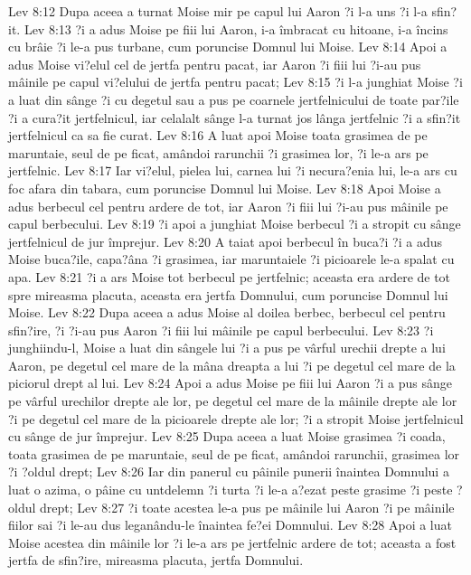 Lev 8:12  Dupa aceea a turnat Moise mir pe capul lui Aaron ?i l-a uns ?i l-a sfin?it.
Lev 8:13  ?i a adus Moise pe fiii lui Aaron, i-a îmbracat cu hitoane, i-a încins cu brâie ?i le-a pus turbane, cum poruncise Domnul lui Moise.
Lev 8:14  Apoi a adus Moise vi?elul cel de jertfa pentru pacat, iar Aaron ?i fiii lui ?i-au pus mâinile pe capul vi?elului de jertfa pentru pacat;
Lev 8:15  ?i l-a junghiat Moise ?i a luat din sânge ?i cu degetul sau a pus pe coarnele jertfelnicului de toate par?ile ?i a cura?it jertfelnicul, iar celalalt sânge l-a turnat jos lânga jertfelnic ?i a sfin?it jertfelnicul ca sa fie curat.
Lev 8:16  A luat apoi Moise toata grasimea de pe maruntaie, seul de pe ficat, amândoi rarunchii ?i grasimea lor, ?i le-a ars pe jertfelnic.
Lev 8:17  Iar vi?elul, pielea lui, carnea lui ?i necura?enia lui, le-a ars cu foc afara din tabara, cum poruncise Domnul lui Moise.
Lev 8:18  Apoi Moise a adus berbecul cel pentru ardere de tot, iar Aaron ?i fiii lui ?i-au pus mâinile pe capul berbecului.
Lev 8:19  ?i apoi a junghiat Moise berbecul ?i a stropit cu sânge jertfelnicul de jur împrejur.
Lev 8:20  A taiat apoi berbecul în buca?i ?i a adus Moise buca?ile, capa?âna ?i grasimea, iar maruntaiele ?i picioarele le-a spalat cu apa.
Lev 8:21  ?i a ars Moise tot berbecul pe jertfelnic; aceasta era ardere de tot spre mireasma placuta, aceasta era jertfa Domnului, cum poruncise Domnul lui Moise.
Lev 8:22  Dupa aceea a adus Moise al doilea berbec, berbecul cel pentru sfin?ire, ?i ?i-au pus Aaron ?i fiii lui mâinile pe capul berbecului.
Lev 8:23  ?i junghiindu-l, Moise a luat din sângele lui ?i a pus pe vârful urechii drepte a lui Aaron, pe degetul cel mare de la mâna dreapta a lui ?i pe degetul cel mare de la piciorul drept al lui.
Lev 8:24  Apoi a adus Moise pe fiii lui Aaron ?i a pus sânge pe vârful urechilor drepte ale lor, pe degetul cel mare de la mâinile drepte ale lor ?i pe degetul cel mare de la picioarele drepte ale lor; ?i a stropit Moise jertfelnicul cu sânge de jur împrejur.
Lev 8:25  Dupa aceea a luat Moise grasimea ?i coada, toata grasimea de pe maruntaie, seul de pe ficat, amândoi rarunchii, grasimea lor ?i ?oldul drept;
Lev 8:26  Iar din panerul cu pâinile punerii înaintea Domnului a luat o azima, o pâine cu untdelemn ?i turta ?i le-a a?ezat peste grasime ?i peste ?oldul drept;
Lev 8:27  ?i toate acestea le-a pus pe mâinile lui Aaron ?i pe mâinile fiilor sai ?i le-au dus leganându-le înaintea fe?ei Domnului.
Lev 8:28  Apoi a luat Moise acestea din mâinile lor ?i le-a ars pe jertfelnic ardere de tot; aceasta a fost jertfa de sfin?ire, mireasma placuta, jertfa Domnului.

